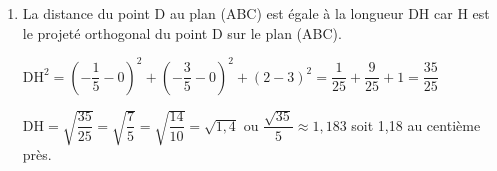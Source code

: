 \documentclass[10pt]{article}
\begin{document}
\begin{enumerate}
\begin{enumerate}
$t+3 \times (3t) +5 \times (3+5t) -8=0 \Longleftrightarrow t+9t+15+25t-8=0 \Longleftrightarrow 35t = -7 \Longleftrightarrow t= -\dfrac{7}{35} = -\dfrac{1}{5}$

Remplaçons $t$ par $-\dfrac{1}{5}$ dans l'équation paramétrique de $\mathcal{D}_{1}$

$\begin{cases} x=- \dfrac{1}{5}\\ y=3 \times \dfrac{-1}{5} = -\dfrac{3}{5} \\ z=3+5 \times \dfrac{-1}{5}  = \dfrac{10}{5}=2 \end{cases} $

Le projeté orthogonal  du point D sur le plan (ABC) est le point H de coordonnées H$\left( - \dfrac{1}{5}~;~- \dfrac{3}{5}~;~2\right)$.

	\item La distance du point D au plan (ABC) est égale à la longueur DH car H est le projeté orthogonal  du point D sur le plan (ABC).

$\mathrm{DH}^2 = {  { \left( - \dfrac{1}{5} - 0  \right) } ^2  + { \left( - \dfrac{3}{5} - 0  \right) } ^2  + (2-3)^2 }= {  \dfrac{1}{25}  +  \dfrac{9}{25}  + 1} ={ \dfrac{35}{25}}$

DH$=\sqrt{ \dfrac{35}{25}}= \sqrt{ \dfrac{7}{5}} = \sqrt{\dfrac{14}{10}} = \sqrt{1,4}$ ou $\dfrac{\sqrt{35}}{5} \approx 1,183$ soit 1,18 au centième près.
	\end{enumerate}
\end{enumerate}
\end{document}
